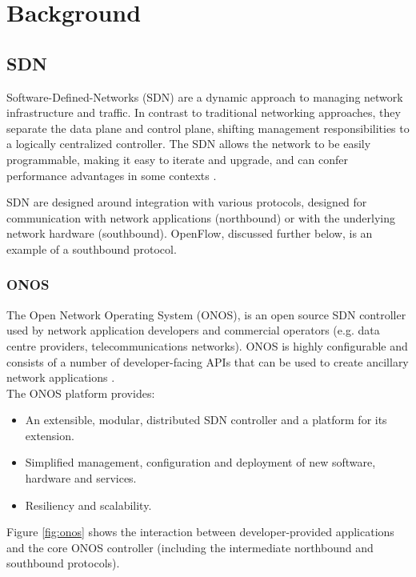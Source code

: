 \section{Background} \label{sec:bg}

\subsection{SDN}
Software-Defined-Networks (SDN) are a dynamic approach to managing network infrastructure and traffic. In contrast to traditional networking approaches, they separate the data plane and control plane, shifting management responsibilities to a logically centralized controller. The SDN allows the network to be easily programmable, making it easy to iterate and upgrade, and can confer performance advantages in some contexts \cite{SDN}.

SDN are designed around integration with various protocols, designed for communication with network applications (northbound) or with the underlying network hardware (southbound). OpenFlow, discussed further below, is an example of a southbound protocol.

\subsubsection{ONOS}

The Open Network Operating System (ONOS), is an open source SDN controller used by network application developers and commercial operators (e.g. data centre providers, telecommunications networks). ONOS is highly configurable and consists of a number of developer-facing APIs that can be used to create ancillary network applications \cite{ONOS}. \\

The ONOS platform provides:
\begin{itemize}
    \item An extensible, modular, distributed SDN controller and a platform for its extension.
    \item Simplified management, configuration and deployment of new software, hardware and services.
    \item Resiliency and scalability. \cite{ONOS}
\end{itemize} 

Figure \ref{fig:onos} shows the interaction between developer-provided applications and the core ONOS controller (including the intermediate northbound and southbound protocols).

